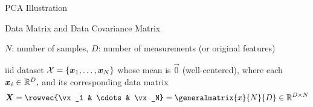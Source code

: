 \documentclass[handout,fleqn,aspectratio=169]{beamer}
\begin{document}
\begin{frame}{PCA Illustration}



\end{frame}






\begin{frame}{Data Matrix and Data Covariance Matrix}

\plitemsep 0.05in

\bci 
\item $N$: number of samples, $D$: number of measurements (or original features)
\item iid dataset ${\cal X} = \{\bm{x}_1, \ldots, \bm{x}_N \}$ whose mean is $\vec{0}$ (well-centered), where each $\bm{x}_i \in {\mathbb R}^{D},$ and its corresponding data matrix 
$$\mX = \rowvec{\vx_1 & \cdots & \vx_N} =\generalmatrix{x}{N}{D}
\in \real^{D \times N}$$

\item {}  

\eci

\end{frame}
\end{document}

